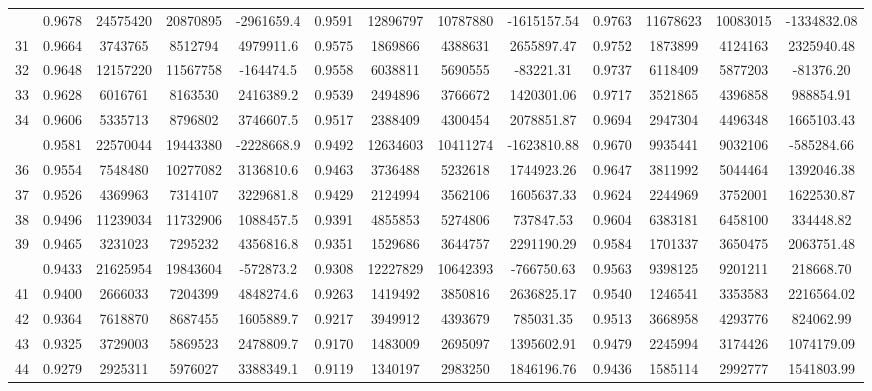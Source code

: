 \documentclass[
  12pt,
]{article}
\begin{document}
\begin{longtable}[t]{lcccccccccccc}
\addlinespace
30 & 0.9678 & 24575420 & 20870895 & -2961659.4 & 0.9591 & 12896797 & 10787880 & -1615157.54 & 0.9763 & 11678623 & 10083015 & -1334832.08\\
31 & 0.9664 & 3743765 & 8512794 & 4979911.6 & 0.9575 & 1869866 & 4388631 & 2655897.47 & 0.9752 & 1873899 & 4124163 & 2325940.48\\
32 & 0.9648 & 12157220 & 11567758 & -164474.5 & 0.9558 & 6038811 & 5690555 & -83221.31 & 0.9737 & 6118409 & 5877203 & -81376.20\\
33 & 0.9628 & 6016761 & 8163530 & 2416389.2 & 0.9539 & 2494896 & 3766672 & 1420301.06 & 0.9717 & 3521865 & 4396858 & 988854.91\\
34 & 0.9606 & 5335713 & 8796802 & 3746607.5 & 0.9517 & 2388409 & 4300454 & 2078851.87 & 0.9694 & 2947304 & 4496348 & 1665103.43\\
\addlinespace
35 & 0.9581 & 22570044 & 19443380 & -2228668.9 & 0.9492 & 12634603 & 10411274 & -1623810.88 & 0.9670 & 9935441 & 9032106 & -585284.66\\
36 & 0.9554 & 7548480 & 10277082 & 3136810.6 & 0.9463 & 3736488 & 5232618 & 1744923.26 & 0.9647 & 3811992 & 5044464 & 1392046.38\\
37 & 0.9526 & 4369963 & 7314107 & 3229681.8 & 0.9429 & 2124994 & 3562106 & 1605637.33 & 0.9624 & 2244969 & 3752001 & 1622530.87\\
38 & 0.9496 & 11239034 & 11732906 & 1088457.5 & 0.9391 & 4855853 & 5274806 & 737847.53 & 0.9604 & 6383181 & 6458100 & 334448.82\\
39 & 0.9465 & 3231023 & 7295232 & 4356816.8 & 0.9351 & 1529686 & 3644757 & 2291190.29 & 0.9584 & 1701337 & 3650475 & 2063751.48\\
\addlinespace
40 & 0.9433 & 21625954 & 19843604 & -572873.2 & 0.9308 & 12227829 & 10642393 & -766750.63 & 0.9563 & 9398125 & 9201211 & 218668.70\\
41 & 0.9400 & 2666033 & 7204399 & 4848274.6 & 0.9263 & 1419492 & 3850816 & 2636825.17 & 0.9540 & 1246541 & 3353583 & 2216564.02\\
42 & 0.9364 & 7618870 & 8687455 & 1605889.7 & 0.9217 & 3949912 & 4393679 & 785031.35 & 0.9513 & 3668958 & 4293776 & 824062.99\\
43 & 0.9325 & 3729003 & 5869523 & 2478809.7 & 0.9170 & 1483009 & 2695097 & 1395602.91 & 0.9479 & 2245994 & 3174426 & 1074179.09\\
44 & 0.9279 & 2925311 & 5976027 & 3388349.1 & 0.9119 & 1340197 & 2983250 & 1846196.76 & 0.9436 & 1585114 & 2992777 & 1541803.99\\

\end{longtable}
\end{document}
